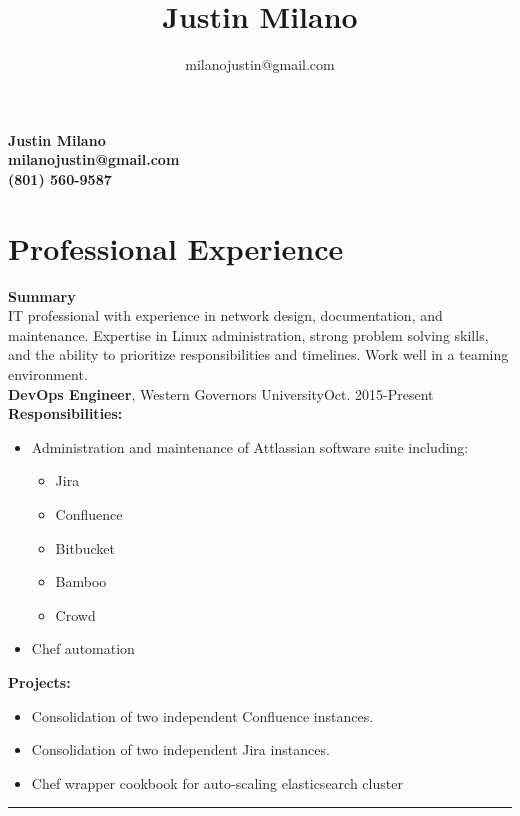 \documentclass[10pt]{article}
\title{\bfseries\Huge Justin Milano}
\author{milanojustin@gmail.com}
\date{}
\newenvironment{myitemize}
{ \begin{itemize}[topsep=0pt]
    \setlength{\itemsep}{0pt}
    \setlength{\parskip}{0pt}
    \setlength{\parsep}{0pt}     }
{ \end{itemize}                  }
\newcommand{\breakrule}{
  	\color{lightgray}
  	\vspace{-4pt}
	\begin{center}
		\noindent\rule{7cm}{0.5pt}
	\end{center}
	}
\begin{document}
\begin{center}
	{\bf \Huge Justin Milano}\\
	\vspace{5pt}
	{\bf \large milanojustin@gmail.com}\\
  {\bf \large (801) 560-9587}
\end{center}

\vspace{-5pt}
\section*{Professional Experience}

\noindent
{\large {\bf Summary}} \\
IT professional with experience in network design, documentation, and maintenance. Expertise in Linux administration, strong problem solving skills, and the ability to prioritize responsibilities and timelines. Work well in a teaming environment. \\

\noindent
{\large {\bf DevOps Engineer}, Western Governors University\hfill Oct. 2015-Present } \\
{\bf Responsibilities:}
\begin{myitemize}
  \item Administration and maintenance of Attlassian software suite including:
    \begin{itemize}
      \item Jira
      \item Confluence
      \item Bitbucket
      \item Bamboo
      \item Crowd
    \end{itemize}
  \item Chef automation
\end{myitemize} 
{\bf Projects:}
\begin{myitemize}
  \item Consolidation of two independent Confluence instances.
  \item Consolidation of two independent Jira instances.
  \item Chef wrapper cookbook for auto-scaling elasticsearch cluster
\end{myitemize} 
{\breakrule}
\end{document}
